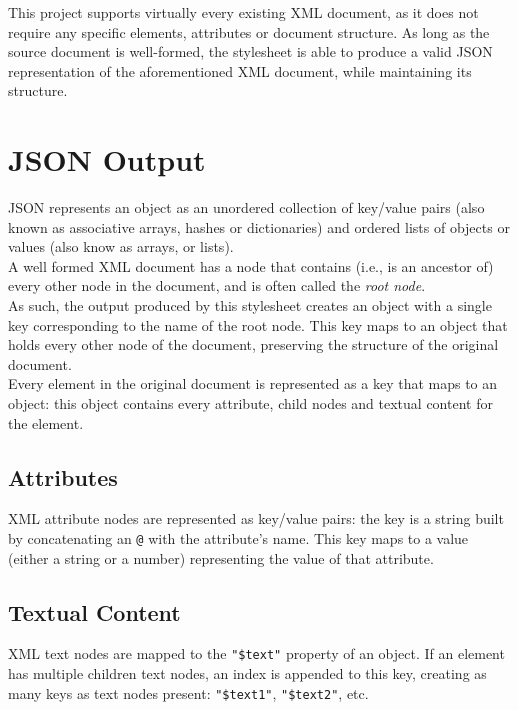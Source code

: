 \documentclass[twocolumn,twoside,10pt,a4paper]{article}
\begin{document}
This project supports virtually every existing XML document, as it does not require any specific elements, attributes or document structure. As long as the source document is well-formed, the stylesheet is able to produce a valid JSON representation of the aforementioned XML document, while maintaining its structure.\\

\section{JSON Output}\label{sec:json-output}

JSON represents an object as an unordered collection of key/value pairs (also known as associative arrays, hashes or dictionaries) and ordered lists of objects or values (also know as arrays, or lists).\\
A well formed XML document has a node that contains (i.e., is an ancestor of) every other node in the document, and is often called the \emph{root node}.\\
As such, the output produced by this stylesheet creates an object with a single key corresponding to the name of the root node. This key maps to an object that holds every other node of the document, preserving the structure of the original document.\\
Every element in the original document is represented as a key that maps to an object: this object contains every attribute, child nodes and textual content for the element.

\subsection{Attributes}

XML attribute nodes are represented as key/value pairs: the key is a string built by concatenating an \verb!@! with the attribute's name. This key maps to a value (either a string or a number) representing the value of that attribute.\\

\subsection{Textual Content}

XML text nodes are mapped to the \verb!"$text"! property of an object. If an element has multiple children text nodes, an index is appended to this key, creating as many keys as text nodes present: \verb!"$text1"!, \verb!"$text2"!, etc.\\
\end{document}
